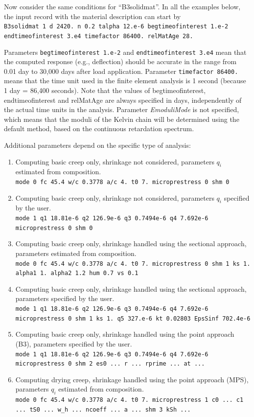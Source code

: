 \documentclass[a4paper]{article}
\newcommand{\param}[1]{{\it #1}}
\begin{document}
Now consider the same conditions for ``B3solidmat''.
In all the examples below,
the input record with the material description can start by\\
{\tt B3solidmat 1 d 2420. n 0.2 talpha 12.e-6 begtimeofinterest 1.e-2\\
endtimeofinterest 3.e4 timefactor 86400. relMatAge 28.}

Parameters {\tt begtimeofinterest 1.e-2} and {\tt endtimeofinterest 3.e4}
mean that
the computed response (e.g., deflection)
should be accurate in the range from 0.01 day to 30,000 days after load
application. 
Parameter {\tt timefactor 86400.}
means that the time unit used in the finite element analysis
is 1 second (because 1 day = 86,400 seconds). 
Note that the values of begtimeofinterest, endtimeofinterest
and relMatAge are always specified in days, independently of the actual
time units in the analysis. 
Parameter \param{EmoduliMode} is not specified, which means that the
moduli of the Kelvin chain will be determined using the default method,
based on the continuous retardation spectrum. 

Additional parameters
depend on the specific type of analysis:
\begin{enumerate}
\item
Computing basic creep only, shrinkage not considered,
parameters $q_i$ estimated from composition.\\
{\tt mode 0 fc 45.4 w/c 0.3778 a/c 4. t0 7. microprestress 0 shm 0} 
\item 
Computing  basic creep only, shrinkage not considered,
parameters $q_i$ specified by the user.\\
{\tt mode 1 q1 18.81e-6 q2 126.9e-6 q3 0.7494e-6 q4 7.692e-6\\ microprestress 0 shm 0} 
\item 
Computing  basic creep only, shrinkage handled using the sectional approach,
parameters estimated from composition.\\
{\tt mode 0 fc 45.4 w/c 0.3778 a/c 4. t0 7. microprestress 0 shm 1 ks 1. alpha1 1. alpha2 1.2 hum 0.7 vs 0.1}
\item 
Computing  basic creep only, shrinkage handled using the sectional approach,
parameters specified by the user.\\
{\tt mode 1 q1 18.81e-6 q2 126.9e-6 q3 0.7494e-6 q4 7.692e-6\\ microprestress 0 shm 1 ks 1. q5 327.e-6 kt 0.02803 EpsSinf 702.4e-6}
\item 
Computing  basic creep only, shrinkage handled using the point approach (B3),
parameters specified by the user.\\
{\tt mode 1 q1 18.81e-6 q2 126.9e-6 q3 0.7494e-6 q4 7.692e-6\\ microprestress 0 shm 2 es0 ... r ... rprime ... at ...}
\item
Computing drying creep, shrinkage handled using the point approach (MPS),
parameters $q_i$ estimated from composition.\\
{\tt mode 0 fc 45.4 w/c 0.3778 a/c 4. t0 7. microprestress 1 c0 ... c1 ... tS0 ... w\_h ... ncoeff ... a ... shm 3 kSh ...}
\end{enumerate}
\end{document}

